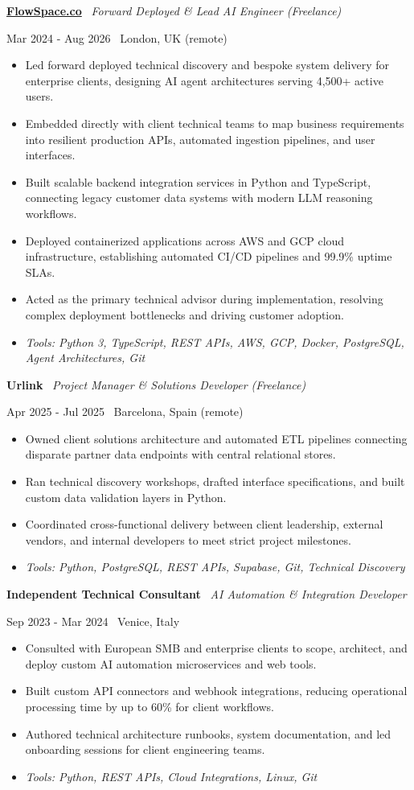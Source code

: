 \documentclass[a4paper,10pt]{article}
\newcommand{\role}[4]{%
  \vspace{2pt}\noindent
  \begin{minipage}[t]{0.70\textwidth}\raggedright\textbf{#1} \textbullet\ \textit{#3}\end{minipage}%
  \hfill
  \begin{minipage}[t]{0.28\textwidth}\raggedleft\footnotesize\color{gray}#2 \textbullet\ #4\end{minipage}%
  \vspace{1pt}%
}
\begin{document}
\role{\href{https://flowspace.co}{FlowSpace.co}}{Mar 2024 - Aug 2026}{Forward Deployed \& Lead AI Engineer (Freelance)}{London, UK (remote)}
\begin{itemize}
  \item Led forward deployed technical discovery and bespoke system delivery for enterprise clients, designing AI agent architectures serving 4,500+ active users.
  \item Embedded directly with client technical teams to map business requirements into resilient production APIs, automated ingestion pipelines, and user interfaces.
  \item Built scalable backend integration services in Python and TypeScript, connecting legacy customer data systems with modern LLM reasoning workflows.
  \item Deployed containerized applications across AWS and GCP cloud infrastructure, establishing automated CI/CD pipelines and 99.9\% uptime SLAs.
  \item Acted as the primary technical advisor during implementation, resolving complex deployment bottlenecks and driving customer adoption.
  \item \textit{Tools: Python 3, TypeScript, REST APIs, AWS, GCP, Docker, PostgreSQL, Agent Architectures, Git}
\end{itemize}

\role{Urlink}{Apr 2025 - Jul 2025}{Project Manager \& Solutions Developer (Freelance)}{Barcelona, Spain (remote)}
\begin{itemize}
  \item Owned client solutions architecture and automated ETL pipelines connecting disparate partner data endpoints with central relational stores.
  \item Ran technical discovery workshops, drafted interface specifications, and built custom data validation layers in Python.
  \item Coordinated cross-functional delivery between client leadership, external vendors, and internal developers to meet strict project milestones.
  \item \textit{Tools: Python, PostgreSQL, REST APIs, Supabase, Git, Technical Discovery}
\end{itemize}

\role{Independent Technical Consultant}{Sep 2023 - Mar 2024}{AI Automation \& Integration Developer}{Venice, Italy}
\begin{itemize}
  \item Consulted with European SMB and enterprise clients to scope, architect, and deploy custom AI automation microservices and web tools.
  \item Built custom API connectors and webhook integrations, reducing operational processing time by up to 60\% for client workflows.
  \item Authored technical architecture runbooks, system documentation, and led onboarding sessions for client engineering teams.
  \item \textit{Tools: Python, REST APIs, Cloud Integrations, Linux, Git}
\end{itemize}
\end{document}
